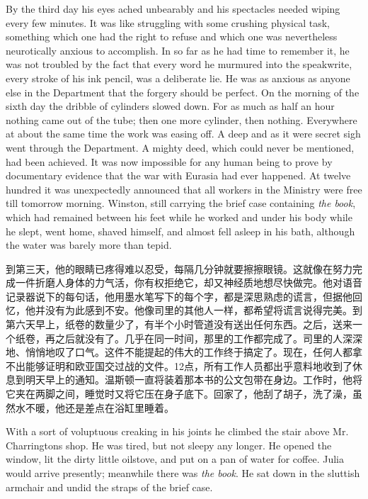 \begin{paracol}{2}
\switchcolumn*

By the third day his eyes ached unbearably and his spectacles needed
wiping every few minutes. It was like struggling with some crushing
physical task, something which one had the right to refuse and which one
was nevertheless neurotically anxious to accomplish. In so far as he had
time to remember it, he was not troubled by the fact that every word he
murmured into the speakwrite, every stroke of his ink pencil, was a
deliberate lie. He was as anxious as anyone else in the Department that
the forgery should be perfect. On the morning of the sixth day the
dribble of cylinders slowed down. For as much as half an hour nothing
came out of the tube; then one more cylinder, then nothing. Everywhere
at about the same time the work was easing off. A deep and as it were
secret sigh went through the Department. A mighty deed, which could
never be mentioned, had been achieved. It was now impossible for any
human being to prove by documentary evidence that the war with Eurasia
had ever happened. At twelve hundred it was unexpectedly announced that
all workers in the Ministry were free till tomorrow morning. Winston,
still carrying the brief case containing \emph{the book}, which had
remained between his feet while he worked and under his body while he
slept, went home, shaved himself, and almost fell asleep in his bath,
although the water was barely more than tepid.

\switchcolumn

到第三天，他的眼睛已疼得难以忍受，每隔几分钟就要擦擦眼镜。这就像在努力完成一件折磨人身体的力气活，你有权拒绝它，却又神经质地想尽快做完。他对语音记录器说下的每句话，他用墨水笔写下的每个字，都是深思熟虑的谎言，但据他回忆，他并没有为此感到不安。他像司里的其他人一样，都希望将谎言说得完美。到第六天早上，纸卷的数量少了，有半个小时管道没有送出任何东西。之后，送来一个纸卷，再之后就没有了。几乎在同一时间，那里的工作都完成了。司里的人深深地、悄悄地叹了口气。这件不能提起的伟大的工作终于搞定了。现在，任何人都拿不出能够证明和欧亚国交过战的文件。12点，所有工作人员都出乎意料地收到了休息到明天早上的通知。温斯顿一直将装着那本书的公文包带在身边。工作时，他将它夹在两脚之间，睡觉时又将它压在身子底下。回家了，他刮了胡子，洗了澡，虽然水不暖，他还是差点在浴缸里睡着。

\switchcolumn*

With a sort of voluptuous creaking in his joints he climbed the stair
above Mr. Charrington\textquotesingle s shop. He was tired, but not
sleepy any longer. He opened the window, lit the dirty little oilstove,
and put on a pan of water for coffee. Julia would arrive presently;
meanwhile there was \emph{the book}. He sat down in the sluttish
armchair and undid the straps of the brief case.


\end{paracol}
